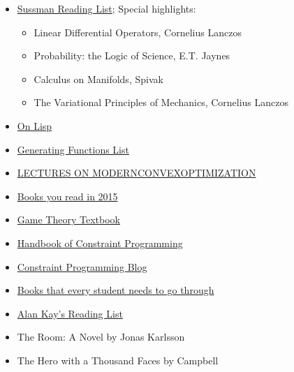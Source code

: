 \begin{itemize}

	\item \href{http://aurellem.org/thoughts/html/sussman-reading-list.html}{Sussman
  Reading List}; Special highlights:

	\begin{itemize}
		\item Linear Differential Operators, Cornelius Lanczos
		\item Probability: the Logic of Science, E.T. Jaynes
		\item Calculus on Manifolds, Spivak
		\item The Variational Principles of Mechanics, Cornelius Lanczos
	\end{itemize}

	\item \href{http://www.paulgraham.com/onlisptext.html}{On Lisp}

	\item \href{http://lacim.uqam.ca/~plouffe/articles/MasterThesis.pdf}{Generating
  Functions List}

	\item \href{http://www2.isye.gatech.edu/~nemirovs/Lect_ModConvOpt.pdf}{LECTURES
  ON MODERNCONVEXOPTIMIZATION}

	\item \href{https://news.ycombinator.com/item?id=10783219}{Books you read in
  2015}

	\item  \href{http://arxiv.org/abs/1512.06808}{Game Theory Textbook}

	\item \href{http://cswww.essex.ac.uk/CSP/papers/CP_Handbook-20060315-final.pdf}{Handbook  of Constraint Programming}
	
	\item \href{http://www.hakank.org/constraint_programming_blog/}{Constraint
  Programming Blog}

	\item \href{http://math.stackexchange.com/questions/94827/books-that-every-student-need\%20s-to-go-through}{Books that every student needs to go through}

	\item \href{http://www.squeakland.org/resources/books/readingList.jsp}{Alan
  Kay's Reading List}

	\item The Room: A Novel by Jonas Karlsson

	\item The Hero with a Thousand Faces by Campbell


\end{itemize}
